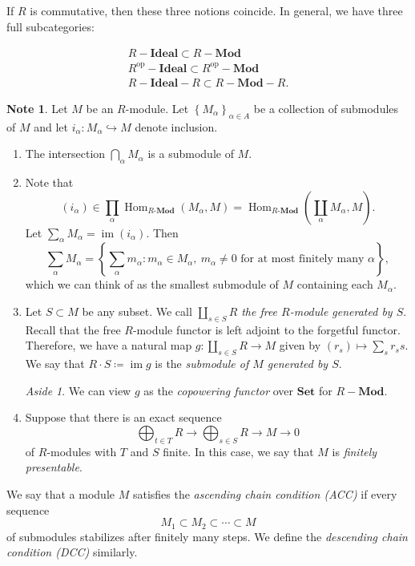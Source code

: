 \documentclass[10pt,letterpaper,cm]{nupset}
\theoremstyle{definition}
\newtheorem{note}[definition]{Note}
\theoremstyle{theorem}
\theoremstyle{remark}
\newtheorem*{aside}{Aside}
\newcommand{\1}{\mathbf{1}}
\newcommand{\0}{\vec 0}
\newcommand{\dcc}{\textsf{DCC}\xspace}
\newcommand{\acc}{\textsf{ACC}\xspace}
\DeclareMathOperator{\op}{op}
\DeclareMathOperator{\im}{im}
\DeclareMathOperator{\Hom}{Hom}
\begin{document}
If $R$ is commutative, then these three notions coincide. In general, we have three full subcategories:

\begin{gather*}
R{-}\mathbf{Ideal} \subset R{-}\mathbf{Mod}
\\ R^{\op}{-}\mathbf{Ideal} \subset R^{\op}{-}\mathbf{Mod}
\\  R{-}\mathbf{Ideal}{-}R  \subset R{-}\mathbf{Mod}{-}R.
\end{gather*} 

\medskip

\begin{note} Let $M$ be an $R$-module. Let $\left\{M_{\alpha}\right\}_{\alpha \in A}$ be a collection of submodules of $M$ and let  $i_{\alpha} :M_{\alpha} \hookrightarrow M$ denote inclusion.
\begin{enumerate}
\item The intersection $\bigcap_{\alpha} M_{\alpha}$ is a submodule of $M$. 
\item Note that $$(i_{\alpha}) \in \prod_{\alpha}\Hom_{R\text{-}\mathbf{Mod}}(M_{\alpha}, M) = \Hom_{R\text{-}\mathbf{Mod}}\left(\coprod_{\alpha} M_{\alpha}, M\right).$$ Let $\sum_{\alpha} M_{\alpha} = \im(i_{\alpha})$. Then $$\sum_{\alpha} M_{\alpha}  = \left\{\sum_{\alpha} m_{\alpha} : m_{\alpha} \in M_{\alpha}, \ m_{\alpha} \ne 0 \text{ for at most finitely many } \alpha\right\},$$ which we can think of as  the
smallest submodule of $M$ containing each $M_{\alpha}$. 
\item Let $S\subset M$ be any subset. We call $\coprod_{s\in S} R$ \textit{the free $R$-module generated by $S$}. Recall that the free $R$-module functor is left adjoint to the forgetful functor. Therefore, we have a natural map $g : \coprod_{s\in S} R \to M$ given by $(r_s) \mapsto \sum_s r_ss$. We say that $R \cdot S \coloneqq \im g$ is the \textit{submodule of $M$ generated by $S$}.
\begin{aside}
We can view $g$ as the \textit{copowering functor} over $\mathbf{Set}$ for $R-\mathbf{Mod}$.  
\end{aside}
\item  Suppose that there is an exact sequence $$\bigoplus_{t\in T}{R}\to \bigoplus_{s\in S}{R} \to M \to 0$$ of $R$-modules with $T$ and $S$ finite. In this case, we say that $M$ is \textit{finitely presentable}. 
\end{enumerate}
\end{note}

\medskip

We say that a module $M$ satisfies the \textit{ascending chain condition (\acc)} if every sequence
\[
M_1 \subset M_2 \subset \cdots \subset M
\]
of submodules stabilizes after finitely many steps. We define the \textit{descending chain condition (\dcc)} similarly.
\end{document}
